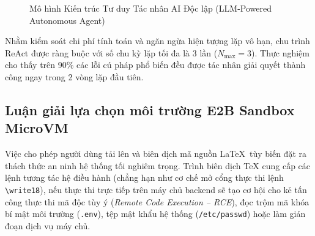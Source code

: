 \begin{figure}[htbp]
\caption{Mô hình Kiến trúc Tư duy Tác nhân AI Độc lập (LLM-Powered Autonomous Agent)}
\label{fig:react_agent_loop}
\end{figure}

Nhằm kiểm soát chi phí tính toán và ngăn ngừa hiện tượng lặp vô hạn, chu trình ReAct được ràng buộc với số chu kỳ lặp tối đa là 3 lần ($N_{\max} = 3$). Thực nghiệm cho thấy trên 90\% các lỗi cú pháp phổ biến đều được tác nhân giải quyết thành công ngay trong 2 vòng lặp đầu tiên.

\subsection{Luận giải lựa chọn môi trường E2B Sandbox MicroVM}
\label{subsec:luan_giai_e2b}
Việc cho phép người dùng tải lên và biên dịch mã nguồn \LaTeX\ tùy biến đặt ra thách thức an ninh hệ thống tối nghiêm trọng. Trình biên dịch TeX cung cấp các lệnh tương tác hệ điều hành (chẳng hạn như cơ chế mở cổng thực thi lệnh \verb|\write18|), nếu thực thi trực tiếp trên máy chủ backend sẽ tạo cơ hội cho kẻ tấn công thực thi mã độc tùy ý (\textit{Remote Code Execution -- RCE}), đọc trộm mã khóa bí mật môi trường (\texttt{.env}), tệp mật khẩu hệ thống (\texttt{/etc/passwd}) hoặc làm gián đoạn dịch vụ máy chủ.

